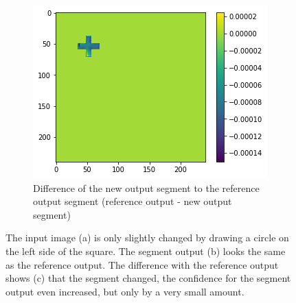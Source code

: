 \begin{figure}[H]
    \begin{subfigure}[t]{.33\textwidth}
        \centering
        \includegraphics[width=\linewidth]{chapters/06_hdm/images_analyze/1c_diff.png}
        \caption{Difference of the new output segment to the reference output segment (reference output - new output segment)}
    \end{subfigure}
    \caption{The input image (a) is only slightly changed by drawing a circle on the left side of the square. The segment output (b) looks the same as the reference output. The difference with the reference output shows (c) that the segment changed, the confidence for the segment output even increased, but only by a very small amount.}
    \label{hdm_changed_output_1}
\end{figure}

